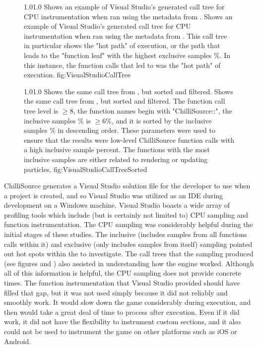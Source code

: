 \begin{figure}
\addtocounter{figure}{-1}

	\vspace{-1.5cm}
	{1.0}{1.0}
	{Shows an example of Visual Studio's generated call tree for CPU instrumentation when ran using the metadata from .}
	{Shows an example of Visual Studio's generated call tree for CPU instrumentation when ran using the metadata from . This call tree in particular shows the "hot path" of execution, or the path that leads to the "function leaf" with the highest exclusive samples \%. In this instance, the function calls that led to  was the "hot path" of execution.}
	{fig:VisualStudioCallTree}

	{1.0}{1.0}
	{Shows the same call tree from , but sorted and filtered.}
	{Shows the same call tree from , but sorted and filtered. The function call tree level is $ \geq 8 $, the function names begin with "ChilliSource::", the inclusive samples \% is $ \geq 6\% $, and it is sorted by the inclusive samples \% in descending order. These parameters were used to ensure that the results were low-level ChilliSource function calls with a high inclusive sample percent. The functions with the most inclusive samples are either related to rendering or updating particles.}
	{fig:VisualStudioCallTreeSorted}
\end{figure}

ChilliSource generates a Visual Studio solution file for the developer to use when a project is created, and so Visual Studio was utilized as an IDE during development on a Windows machine. Visual Studio boasts a wide array of profiling tools which include (but is certainly not limited to) CPU sampling and function instrumentation. The CPU sampling was considerably helpful during the initial stages of these studies. The inclusive (includes samples from all functions calls within it) and exclusive (only includes samples from itself) sampling pointed out hot spots within the  to investigate. The call trees that the sampling produced (see figures  and ) also assisted in understanding how the engine worked. Although all of this information is helpful, the CPU sampling does not provide concrete times. The function instrumentation that Visual Studio provided should have filled that gap, but it was not used simply because it did not reliably and smoothly work. It would slow down the game considerably during execution, and then would take a great deal of time to process after execution. Even if it did work, it did not have the flexibility to instrument custom sections, and it also could not be used to instrument the game on other platforms such as iOS or Android.

